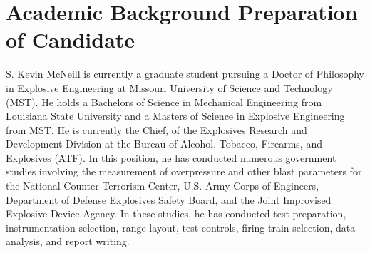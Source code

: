 \section{Academic Background Preparation of Candidate}
S. Kevin McNeill is currently a graduate student pursuing a Doctor of Philosophy in Explosive Engineering at Missouri University of Science and Technology (MST). He holds a Bachelors of Science in Mechanical Engineering from Louisiana State University and a Masters of Science in Explosive Engineering from MST. He is currently the Chief, of the Explosives Research and Development Division at the Bureau of Alcohol, Tobacco, Firearms, and Explosives (ATF).  In this position, he has conducted numerous government studies involving the measurement of overpressure and other blast parameters for the National Counter Terrorism Center, U.S. Army Corps of Engineers, Department of Defense Explosives Safety Board, and the Joint Improvised Explosive Device Agency.  In these studies, he has conducted test preparation, instrumentation selection, range layout, test controls, firing train selection, data analysis, and report writing.
